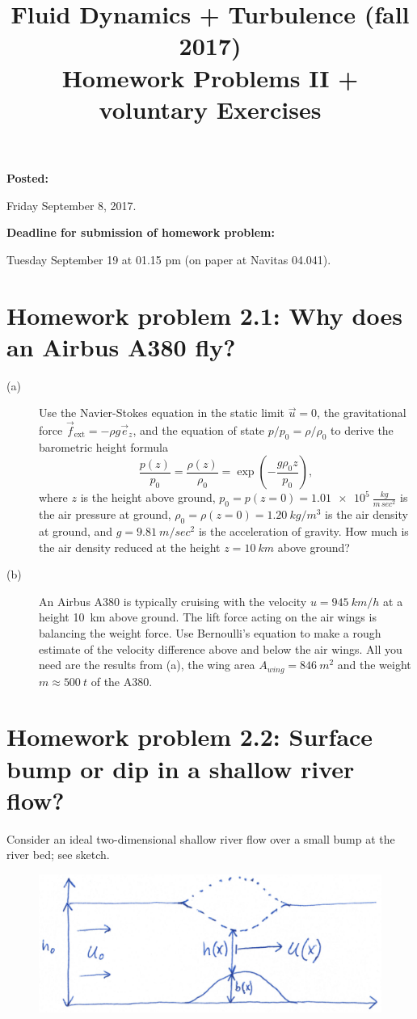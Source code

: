 \documentclass[a4paper, 10pt]{article}
\title{Fluid Dynamics + Turbulence (fall 2017)\\Homework Problems II + voluntary Exercises}
\author{}
\date{}
\begin{document}
\maketitle

\large{
\textbf{Posted:}

Friday September 8, 2017.

\bigskip
\textbf{Deadline for submission of homework problem:}

Tuesday September 19 at 01.15 pm (on paper at Navitas 04.041).
}

\bigskip

\section*{Homework problem 2.1: Why does an Airbus A380 fly?}
\begin{description}
\item[(a)]
Use the Navier-Stokes equation in the static limit $\vec{u}=0$, the gravitational force $\vec{f}_\mathrm{ext} = -\rho g \vec{e}_z$,  and the equation of state $p/p_0=\rho/\rho_0$ to derive the barometric height formula
\begin{equation*}
    \frac{p(z)}{p_0} = \frac{\rho(z)}{\rho_0} = \exp \left(-\frac{g\rho_0 z}{p_0}\right),
\end{equation*}
where $z$ is the height above ground, $p_0=p(z=0)=\SI{1.01e5}{\frac{kg}{m\, sec^2}}$ is the air pressure at ground, $\rho_0=\rho(z=0)=\SI{1.20}{kg/m^3}$ is the air density at ground, and $g=\SI{9.81}{m/sec^2}$ is the acceleration of gravity. How much is the air density reduced at the height $z=\SI{10}{km}$ above ground?

\item[(b)]
An Airbus A380 is typically cruising with the velocity $u=\SI{945}{km/h}$ at a height \SI{10}{km} above ground. The lift force acting on the air wings is balancing the weight force. Use Bernoulli's equation to make a rough estimate of the velocity difference above and below the air wings. All you need are the results from (a), the wing area $A_{wing} = \SI{846}{m^2}$ and the weight $m \approx \SI{500}{t}$ of the A380.
\end{description}

\newpage
\section*{Homework problem 2.2: Surface bump or dip in a shallow river flow?} 
Consider an ideal two-dimensional shallow river flow over a small bump at the river bed; see sketch.
\begin{figure}[h!]
	\centering
	\includegraphics[width=.7\textwidth]{bump.png}
\end{figure}
\end{document}
